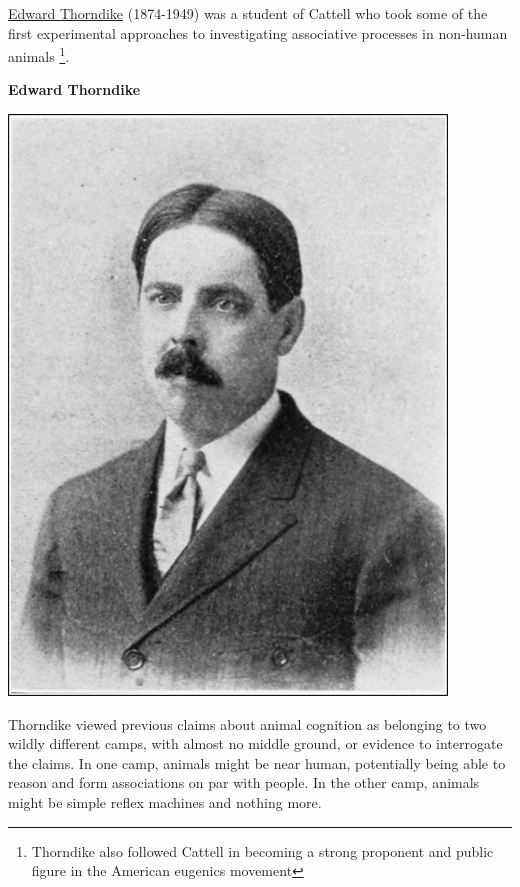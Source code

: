 \documentclass[
  oneside,
  12pt]{crumpbook}
\newenvironment{floatrightbox25}{%
  \wrapfigure{R}{.25\textwidth}%
  }{%
  \endwrapfigure}
\begin{document}
\href{https://en.wikipedia.org/wiki/Edward_Thorndike}{Edward Thorndike} (1874-1949) was a student of Cattell who took some of the first experimental approaches to investigating associative processes in non-human animals \footnote{Thorndike also followed Cattell in becoming a strong proponent and public figure in the American eugenics movement}.

\begin{floatrightbox25}
\textbf{Edward Thorndike}

\includegraphics[width=1\linewidth]{imgs/Edward_thorndike}

\end{floatrightbox25}

Thorndike viewed previous claims about animal cognition as belonging to two wildly different camps, with almost no middle ground, or evidence to interrogate the claims. In one camp, animals might be near human, potentially being able to reason and form associations on par with people. In the other camp, animals might be simple reflex machines and nothing more.
\end{document}

